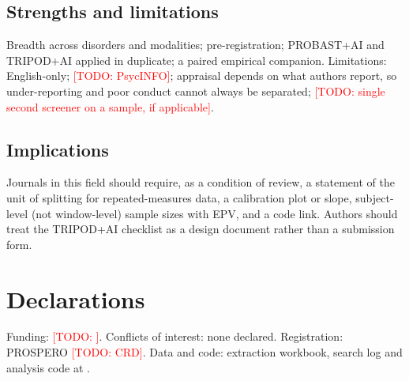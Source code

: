 \documentclass[11pt,a4paper]{article}
\newcommand{\todo}[1]{\textcolor{red}{[TODO: #1]}}
\begin{document}
\subsection{Strengths and limitations}
Breadth across disorders and modalities; pre-registration; PROBAST+AI and TRIPOD+AI applied in
duplicate; a paired empirical companion. Limitations: English-only; \todo{PsycINFO}; appraisal
depends on what authors report, so under-reporting and poor conduct cannot always be separated;
\todo{single second screener on a sample, if applicable}.

\subsection{Implications}
Journals in this field should require, as a condition of review, a statement of the unit of
splitting for repeated-measures data, a calibration plot or slope, subject-level (not window-level)
sample sizes with EPV, and a code link. Authors should treat the TRIPOD+AI checklist as a design
document rather than a submission form.

\section*{Declarations}
Funding: \todo{}. Conflicts of interest: none declared. Registration: PROSPERO \todo{CRD}. Data
and code: extraction workbook, search log and analysis code at \cite{repo}.
\end{document}
